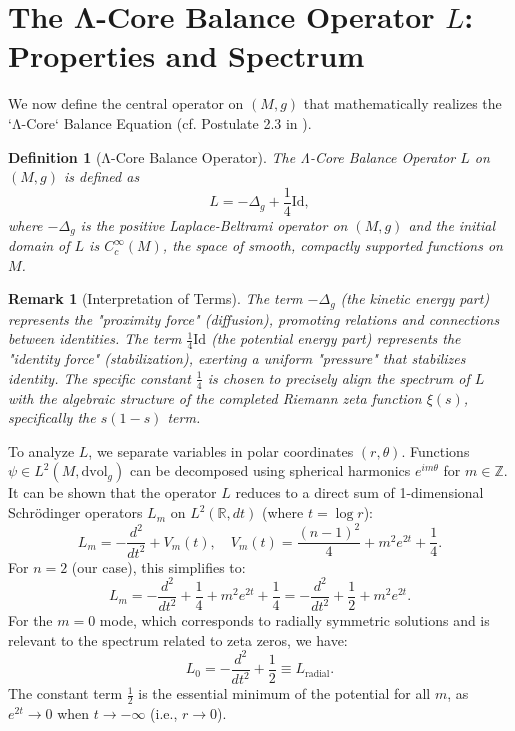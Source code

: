 \documentclass[12pt]{article}
\newtheorem{definition}[theorem]{Definition}
\newtheorem{remark}[theorem]{Remark}
\begin{document}
\section{The Λ-Core Balance Operator $L$: Properties and Spectrum}

We now define the central operator on $(M, g)$ that mathematically realizes the `Λ-Core` Balance Equation (cf. Postulate 2.3 in \cite{iyer2024metaphysics}).

\begin{definition}[Λ-Core Balance Operator]
The \textit{Λ-Core Balance Operator} $L$ on $(M, g)$ is defined as
\begin{equation}
L = -\Delta_g + \frac{1}{4}\text{Id},
\end{equation}
where $-\Delta_g$ is the positive Laplace-Beltrami operator on $(M, g)$ and the initial domain of $L$ is $C_c^\infty(M)$, the space of smooth, compactly supported functions on $M$.
\end{definition}

\begin{remark}[Interpretation of Terms]
The term $-\Delta_g$ (the kinetic energy part) represents the "proximity force" (diffusion), promoting relations and connections between identities. The term $\frac{1}{4}\text{Id}$ (the potential energy part) represents the "identity force" (stabilization), exerting a uniform "pressure" that stabilizes identity. The specific constant $\frac{1}{4}$ is chosen to precisely align the spectrum of $L$ with the algebraic structure of the completed Riemann zeta function $\xi(s)$, specifically the $s(1-s)$ term.
\end{remark}

To analyze $L$, we separate variables in polar coordinates $(r, \theta)$. Functions $\psi \in L^2(M, \text{dvol}_g)$ can be decomposed using spherical harmonics $e^{im\theta}$ for $m \in \mathbb{Z}$. It can be shown that the operator $L$ reduces to a direct sum of 1-dimensional Schr\"odinger operators $L_m$ on $L^2(\mathbb{R}, dt)$ (where $t = \log r$):
\begin{equation}
L_m = -\frac{d^2}{dt^2} + V_m(t), \quad V_m(t) = \frac{(n-1)^2}{4} + m^2 e^{2t} + \frac{1}{4}.
\end{equation}
For $n=2$ (our case), this simplifies to:
\begin{equation}
L_m = -\frac{d^2}{dt^2} + \frac{1}{4} + m^2 e^{2t} + \frac{1}{4} = -\frac{d^2}{dt^2} + \frac{1}{2} + m^2 e^{2t}.
\end{equation}
For the $m = 0$ mode, which corresponds to radially symmetric solutions and is relevant to the spectrum related to zeta zeros, we have:
\begin{equation} \label{eq:L_radial}
L_0 = -\frac{d^2}{dt^2} + \frac{1}{2} \equiv L_{\text{radial}}.
\end{equation}
The constant term $\frac{1}{2}$ is the essential minimum of the potential for all $m$, as $e^{2t} \to 0$ when $t \to -\infty$ (i.e., $r \to 0$).
\end{document}
